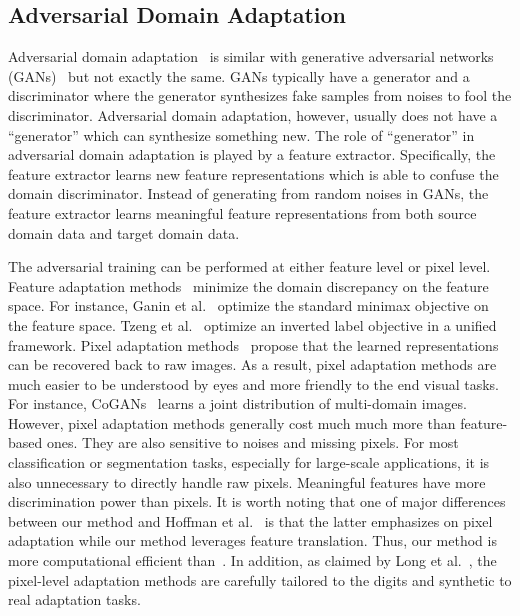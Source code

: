 \documentclass[sigconf]{acmart}
\begin{document}
\subsection{Adversarial Domain Adaptation}  
Adversarial domain adaptation~\cite{pan2011domain,gong2012geodesic,ding2014latent,long2018conditional} is similar with generative adversarial networks (GANs)~\cite{goodfellow2014generative} but not exactly the same. GANs typically have a generator and a discriminator where the generator synthesizes fake samples from noises to fool the discriminator. Adversarial domain adaptation, however, usually does not have a ``generator'' which can synthesize something new. The role of ``generator'' in adversarial domain adaptation is played by a feature extractor. Specifically, the feature extractor learns new feature representations which is able to confuse the domain discriminator. Instead of generating from random noises in GANs, the feature extractor learns meaningful feature representations from both source domain data and target domain data.

The adversarial training can be performed at either feature level or pixel level. Feature adaptation methods~\cite{ganin2016domain,tzeng2017adversarial,long2018conditional} minimize the domain discrepancy on the feature space. For instance, Ganin et al.~\cite{ganin2016domain} optimize the standard minimax objective on the feature space. Tzeng et al.~\cite{tzeng2017adversarial} optimize an inverted label objective in a unified framework. Pixel adaptation methods~\cite{bousmalis2017unsupervised,liu2016coupled} propose that the learned representations can be recovered back to raw images. As a result, pixel adaptation methods are much easier to be understood by eyes and more friendly to the end visual tasks. For instance, CoGANs~\cite{liu2016coupled} learns a joint distribution of multi-domain images. However, pixel adaptation methods generally cost much much more than feature-based ones. They are also sensitive to noises and missing pixels. For most classification or segmentation tasks, especially for large-scale applications, it is also unnecessary to directly handle raw pixels. Meaningful features have more discrimination power than pixels. It is worth noting that one of major differences between our method and Hoffman et al.~\cite{hoffman2018cycada} is that the latter emphasizes on pixel adaptation while our method leverages feature translation. Thus, our method is more computational efficient than~\cite{hoffman2018cycada}. In addition, as claimed by Long et al.~\cite{long2018conditional}, the pixel-level adaptation methods are carefully tailored to the digits and synthetic to real adaptation tasks.  
\end{document}
